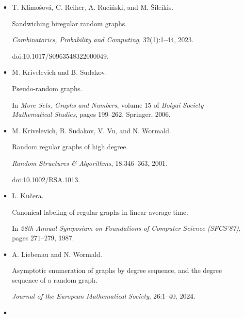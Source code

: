 \begin{itemize}
\item[] 
[34]

T. Klimošová, C. Reiher, A. Ruciński, and M. Šileikis.


Sandwiching biregular random graphs.


\emph{Combinatorics, Probability and Computing}, 32(1):1–44, 2023.


doi:10.1017/S0963548322000049.





\item[] 
[35]

M. Krivelevich and B. Sudakov.


Pseudo-random graphs.


In \emph{More Sets, Graphs and Numbers}, volume 15 of \emph{Bolyai
Society Mathematical Studies}, pages 199–262. Springer, 2006.





\item[] 
[36]

M. Krivelevich, B. Sudakov, V. Vu, and N. Wormald.


Random regular graphs of high degree.


\emph{Random Structures \& Algorithms}, 18:346–363, 2001.


doi:10.1002/RSA.1013.





\item[] 
[37]

L. Kučera.


Canonical labeling of regular graphs in linear average time.


In \emph{28th Annual Symposium on Foundations of Computer Science
(SFCS’87)}, pages 271–279, 1987.





\item[] 
[38]

A. Liebenau and N. Wormald.


Asymptotic enumeration of graphs by degree sequence, and the degree
sequence of a random graph.


\emph{Journal of the European Mathematical Society}, 26:1–40, 2024.





\item[] 
[39]


\end{itemize}
